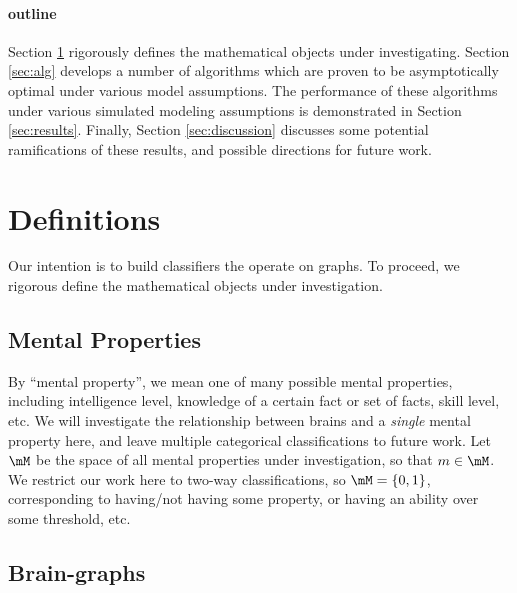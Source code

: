 \documentclass{article}
\begin{document}
\paragraph{outline}


Section \ref{sec:def} rigorously defines the mathematical objects under investigating.  Section \ref{sec:alg} develops a number of algorithms which are proven to be asymptotically optimal under various model assumptions.  The performance of these algorithms under various simulated modeling assumptions is demonstrated in Section \ref{sec:results}.  Finally, Section \ref{sec:discussion} discusses some potential ramifications of these results, and possible directions for future work.


\section{Definitions} %
\label{sec:def}

Our intention is to build classifiers the operate on graphs.  To proceed, we rigorous define the mathematical objects under investigation.

\subsection{Mental Properties} %
\label{sub:mental_properties}

By ``mental property'', we mean one of many possible mental properties, including intelligence level, knowledge of a certain fact or set of facts, skill level, etc.  We will investigate the relationship between brains and a \emph{single} mental property here, and leave multiple categorical classifications to future work.  Let $\mM$ be the space of all mental properties under investigation, so that $m \in \mM$.  We restrict our work here to two-way classifications, so $\mM=\{0,1\}$, corresponding to having/not having some property, or having an ability over some threshold, etc.  


\subsection{Brain-graphs} %
\label{sub:brain_graphs}
\end{document}
